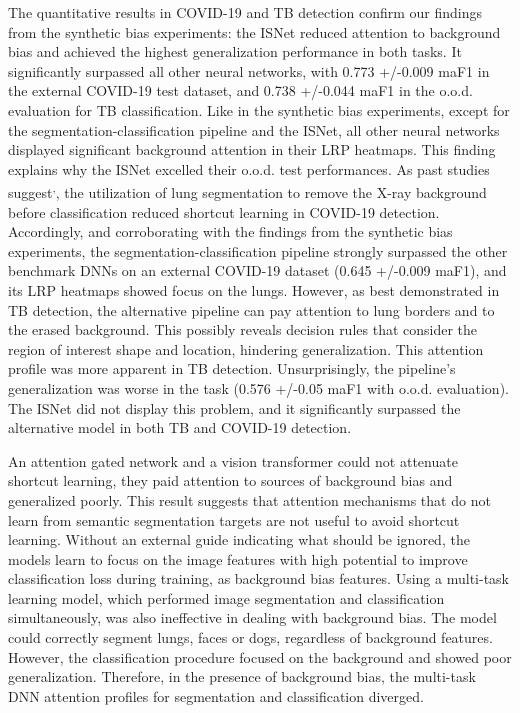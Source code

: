 \documentclass[fleqn,10pt]{wlscirep}
\begin{document}
{The quantitative results in COVID-19 and TB detection confirm our findings from the synthetic bias experiments: the ISNet reduced attention to background bias and achieved the highest generalization performance in both tasks. It significantly surpassed all other neural networks, with 0.773 +/-0.009 maF1 in the external COVID-19 test dataset, and 0.738 +/-0.044 maF1 in the o.o.d. evaluation for TB classification. Like in the synthetic bias experiments, except for the segmentation-classification pipeline and the ISNet, all other neural networks displayed significant background attention in their LRP heatmaps. This finding explains why the ISNet excelled their o.o.d. test performances. As past studies suggest\cite{bassi2021covid19}\textsuperscript{,}\cite{covidSegmentation}, the utilization of lung segmentation to remove the X-ray background before classification reduced shortcut learning in COVID-19 detection. Accordingly, and corroborating with the findings from the synthetic bias experiments, the segmentation-classification pipeline strongly surpassed the other benchmark DNNs on an external COVID-19 dataset (0.645 +/-0.009 maF1), and its LRP heatmaps showed focus on the lungs. However, as best demonstrated in TB detection, the alternative pipeline can pay attention to lung borders and to the erased background. This possibly reveals decision rules that consider the region of interest shape and location, hindering generalization. This attention profile was more apparent in TB detection. Unsurprisingly, the pipeline's generalization was worse in the task (0.576 +/-0.05 maF1 with o.o.d. evaluation). The ISNet did not display this problem, and it significantly surpassed the alternative model in both TB and COVID-19 detection. 

An attention gated network and a vision transformer could not attenuate shortcut learning, they paid attention to sources of background bias and generalized poorly. This result suggests that attention mechanisms that do not learn from semantic segmentation targets are not useful to avoid shortcut learning. Without an external guide indicating what should be ignored, the models learn to focus on the image features with high potential to improve classification loss during training, as background bias features. Using a multi-task learning model, which performed image segmentation and classification simultaneously, was also ineffective in dealing with background bias. The model could correctly segment lungs, faces or dogs, regardless of background features. However, the classification procedure focused on the background and showed poor generalization. Therefore, in the presence of background bias, the multi-task DNN attention profiles for segmentation and classification diverged.

}
\end{document}
